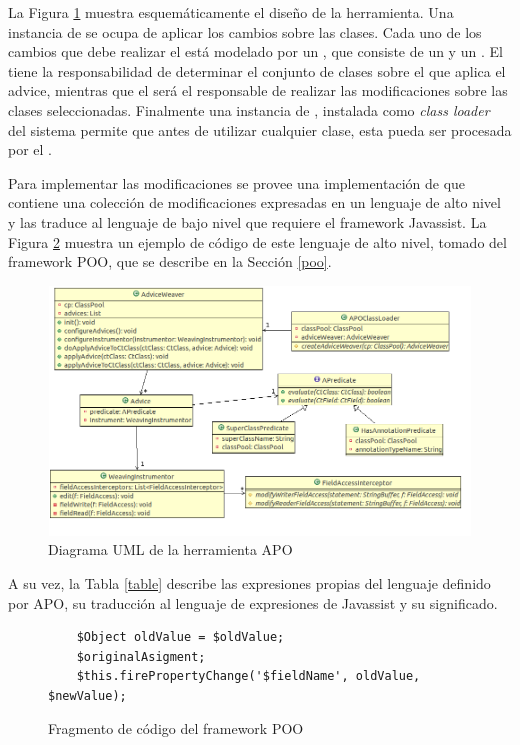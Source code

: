 		La Figura \ref{aopImage} muestra esquemáticamente el diseño de la herramienta.
		Una instancia de  se ocupa de aplicar los cambios sobre las
		clases.
		Cada uno de los cambios que debe realizar el  está
		modelado por un , que consiste de un  y un
		.
		El  tiene la responsabilidad de determinar el conjunto de
		clases sobre el que aplica el advice, mientras que el
		 será el responsable de realizar las modificaciones
		sobre las clases seleccionadas.
		Finalmente una instancia de , instalada como \emph{class
		loader} del sistema permite que antes de utilizar cualquier clase, esta pueda
		ser procesada por el .
		
		Para implementar las modificaciones se provee una implementación de
		 que contiene una colección de modificaciones expresadas en un
		lenguaje de alto nivel y las traduce al lenguaje de bajo nivel que requiere el
		framework Javassist.
		La Figura \ref{pooCode} muestra un ejemplo de código de este lenguaje de alto nivel,
		tomado del framework POO, que se describe en la Sección \ref{poo}.
		
		\begin{figure}[h]
			\centering
			\includegraphics[width=450px, height=250px]{img/aop}
			\caption{Diagrama UML de la herramienta APO}
			\label{aopImage}
		\end{figure}	 
		
		
		A su vez, la Tabla \ref{table} describe las expresiones propias del lenguaje
		definido por APO, su traducción al lenguaje de expresiones de
		Javassist y su significado.
		
		\begin{figure}[h]
			\begin{lstlisting}
	$Object oldValue = $oldValue;
	$originalAsigment;
	$this.firePropertyChange('$fieldName', oldValue, $newValue);
			\end{lstlisting}
			\caption{Fragmento de código del framework POO}
			\label{pooCode}
		\end{figure}
		
